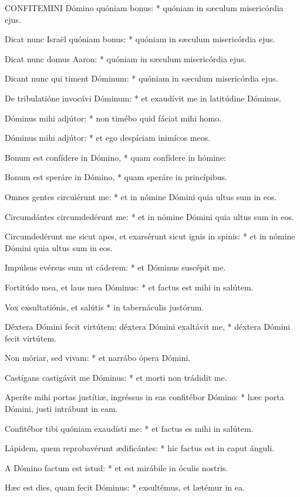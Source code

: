 
\lettrine[lines=2]{C}{ONFITEMINI} Dómino quóniam bonus: * quóniam in sæculum misericórdia ejus.

Dicat nunc Israël quóniam bonus: * quóniam in sæculum misericórdia ejus.

Dicat nunc domus Aaron: * quóniam in sæculum misericórdia ejus.

Dicant nunc qui timent Dóminum: * quóniam in sæculum misericórdia ejus.

De tribulatióne invocávi Dóminum: * et exaudívit me in latitúdine Dóminus.

Dóminus mihi adjútor: * non timébo quid fáciat mihi homo.

Dóminus mihi adjútor: * et ego despíciam inimícos meos.

Bonum est confídere in Dómino, * quam confídere in hómine:

Bonum est speráre in Dómino, * quam speráre in princípibus.

Omnes gentes circuiérunt me: * et in nómine Dómini quia ultus sum in eos.

Circumdántes circumdedérunt me: * et in nómine Dómini quia ultus sum in eos.

Circumdedérunt me sicut apes, et exarsérunt sicut ignis in spinis: * et in nómine Dómini quia ultus sum in eos.

Impúlsus evérsus sum ut cáderem: * et Dóminus suscépit me.

Fortitúdo mea, et laus mea Dóminus: * et factus est mihi in salútem.

Vox exsultatiónis, et salútis * in tabernáculis justórum.

Déxtera Dómini fecit virtútem: déxtera Dómini exaltávit me, * déxtera Dómini fecit virtútem.

Non móriar, sed vivam: * et narrábo ópera Dómini.

Castígans castigávit me Dóminus: * et morti non trádidit me.

Aperíte mihi portas justítiæ, ingréssus in eas confitébor Dómino: * hæc porta Dómini, justi intrábunt in eam.

Confitébor tibi quóniam exaudísti me: * et factus es mihi in salútem.

Lápidem, quem reprobavérunt ædificántes: * hic factus est in caput ánguli.

A Dómino factum est istud: * et est mirábile in óculis nostris.

Hæc est dies, quam fecit Dóminus: * exsultémus, et lætémur in ea.

